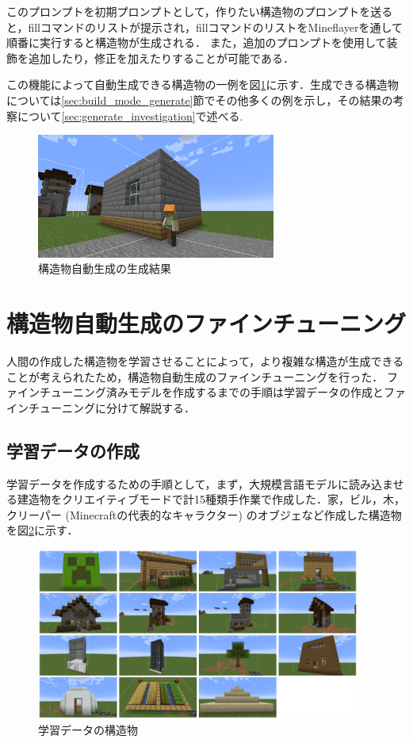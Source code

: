 このプロンプトを初期プロンプトとして，作りたい構造物のプロンプトを送ると，fillコマンドのリストが提示され，fillコマンドのリストをMineflayerを通して順番に実行すると構造物が生成される．
また，追加のプロンプトを使用して装飾を追加したり，修正を加えたりすることが可能である．

この機能によって自動生成できる構造物の一例を図\ref{fig:generate_example}に示す．生成できる構造物については\ref{sec:build_mode_generate}節でその他多くの例を示し，その結果の考察について\ref{sec:generate_investigation}で述べる.

\begin{figure}[H]
    \centering
    \includegraphics[width=0.7\textwidth]{fig/generate_example.png}
    \caption{構造物自動生成の生成結果}
    \label{fig:generate_example}
\end{figure}

\section{構造物自動生成のファインチューニング}
人間の作成した構造物を学習させることによって，より複雑な構造が生成できることが考えられたため，構造物自動生成のファインチューニングを行った．
ファインチューニング済みモデルを作成するまでの手順は学習データの作成とファインチューニングに分けて解説する．

\subsection{学習データの作成}
学習データを作成するための手順として，まず，大規模言語モデルに読み込ませる建造物をクリエイティブモードで計15種類手作業で作成した．家，ビル，木，クリーパー (Minecraftの代表的なキャラクター) のオブジェなど作成した構造物を図\ref{fig:train_structure}に示す．

\begin{figure}[H]
    \centering
    \includegraphics[width=0.95\textwidth]{fig/train_data.PNG}
    \caption{学習データの構造物}
    \label{fig:train_structure}
\end{figure}

